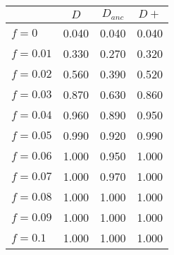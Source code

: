 \begin{tabular}{lccc}
\toprule
 & $D$ & $D_{anc}$ & $D+$ \\
\midrule
$f = 0$ & 0.040 & 0.040 & 0.040 \\
$f = 0.01$ & 0.330 & 0.270 & 0.320 \\
$f = 0.02$ & 0.560 & 0.390 & 0.520 \\
$f = 0.03$ & 0.870 & 0.630 & 0.860 \\
$f = 0.04$ & 0.960 & 0.890 & 0.950 \\
$f = 0.05$ & 0.990 & 0.920 & 0.990 \\
$f = 0.06$ & 1.000 & 0.950 & 1.000 \\
$f = 0.07$ & 1.000 & 0.970 & 1.000 \\
$f = 0.08$ & 1.000 & 1.000 & 1.000 \\
$f = 0.09$ & 1.000 & 1.000 & 1.000 \\
$f = 0.1$ & 1.000 & 1.000 & 1.000 \\
\bottomrule
\end{tabular}
